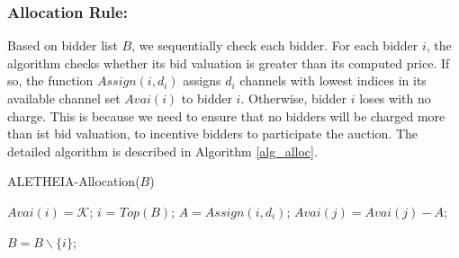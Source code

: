 \documentclass{sig-alternate}
\begin{document}
\subsubsection{Allocation Rule:}
Based on bidder list $B$, we sequentially check each bidder. For each bidder $i$, the algorithm checks whether its bid valuation is greater than its computed price. If so, the function $Assign(i,d_i)$ assigns $d_i$ channels with lowest indices in its available channel set $Avai(i)$ to bidder $i$. Otherwise, bidder $i$ loses with no charge. This is because we need to ensure that no bidders will be charged more than ist bid valuation, to incentive bidders to participate the auction. The detailed algorithm is described in Algorithm \ref{alg_alloc}.

{\renewcommand\baselinestretch{1}\selectfont
\begin{algorithm}[h]
    \caption{ALETHEIA-Allocation($B$)}
    \label{alg_alloc}
    \begin{algorithmic}[1]
            \STATE $Avai(i) = \mathcal{K}$;
        \ENDFOR
            \STATE $i$ = $Top(B)$;
                \STATE $A = Assign(i,d_i)$;
                    \STATE $Avai(j) = Avai(j) - A$;

                \ENDFOR
            \ELSE
            \ENDIF
            \STATE $B = B\backslash \{i\}$;
        \ENDWHILE
    \end{algorithmic}
\end{algorithm}
\par}
\end{document}
